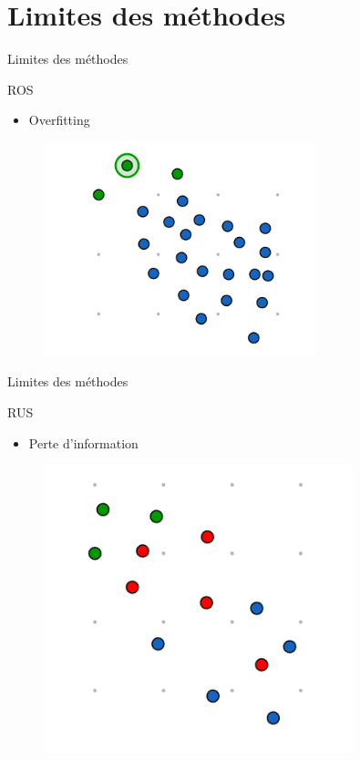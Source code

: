 \documentclass{beamer}
\begin{document}
\section{Limites des méthodes}

\begin{frame}{Limites des méthodes}
\begin{block}{ROS}
    \begin{itemize}
       \item Overfitting
   \end{itemize}
\end{block}
    \begin{figure}
    \centering
    \includegraphics[width=0.7\textwidth]{images/lROS.png}

\end{figure}
\end{frame}

\begin{frame}{Limites des méthodes}
\begin{block}{RUS}
    \begin{itemize}
    \item Perte d'information
   \end{itemize}
\end{block}
    \begin{figure}
    \centering
    \includegraphics[width=0.8\textwidth]{images/lrus.png}

\end{figure}
\end{frame}
\end{document}
